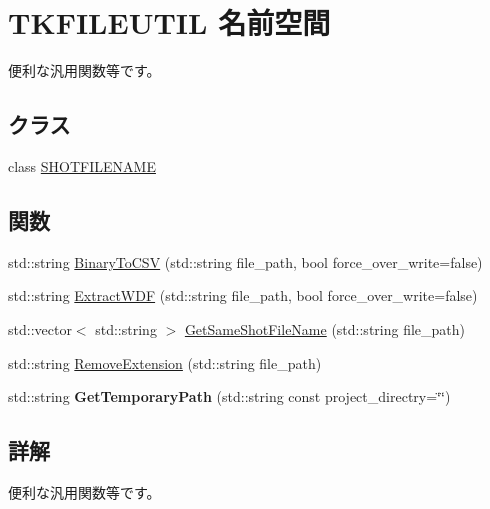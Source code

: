 \hypertarget{namespace_t_k_f_i_l_e_u_t_i_l}{}\section{T\+K\+F\+I\+L\+E\+U\+T\+IL 名前空間}
\label{namespace_t_k_f_i_l_e_u_t_i_l}


便利な汎用関数等です。  


\subsection*{クラス}
\begin{DoxyCompactItemize}
\item 
class \hyperlink{class_t_k_f_i_l_e_u_t_i_l_1_1_s_h_o_t_f_i_l_e_n_a_m_e}{S\+H\+O\+T\+F\+I\+L\+E\+N\+A\+ME}
\end{DoxyCompactItemize}
\subsection*{関数}
\begin{DoxyCompactItemize}
\item 
std\+::string \hyperlink{namespace_t_k_f_i_l_e_u_t_i_l_afb1f2be7ac9b585fc688a2c9a0e50094}{Binary\+To\+C\+SV} (std\+::string file\+\_\+path, bool force\+\_\+over\+\_\+write=false)
\item 
std\+::string \hyperlink{namespace_t_k_f_i_l_e_u_t_i_l_a021f69b1dbf05a9501e30326b836c2a9}{Extract\+W\+DF} (std\+::string file\+\_\+path, bool force\+\_\+over\+\_\+write=false)
\item 
std\+::vector$<$ std\+::string $>$ \hyperlink{namespace_t_k_f_i_l_e_u_t_i_l_a378ed1b7bfa3028b922a122f72f38b28}{Get\+Same\+Shot\+File\+Name} (std\+::string file\+\_\+path)
\item 
std\+::string \hyperlink{namespace_t_k_f_i_l_e_u_t_i_l_ae7b4e47d9221322ea5dbaaaefd83b2b6}{Remove\+Extension} (std\+::string file\+\_\+path)
\item 
\mbox{\label{namespace_t_k_f_i_l_e_u_t_i_l_a88c3a996f60ae1915744d6aa432ea79b}} 
std\+::string {\bfseries Get\+Temporary\+Path} (std\+::string const project\+\_\+directry=\char`\"{}\char`\"{})
\end{DoxyCompactItemize}


\subsection{詳解}
便利な汎用関数等です。 

